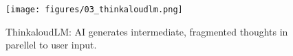 \begin{figure}
    \centering
  \texttt{[image: figures/03\_thinkaloudlm.png]}
    \caption{ThinkaloudLM: AI generates intermediate, fragmented thoughts in parellel to user input.}
    \label{fig:thinkaloudlm}
\end{figure}
